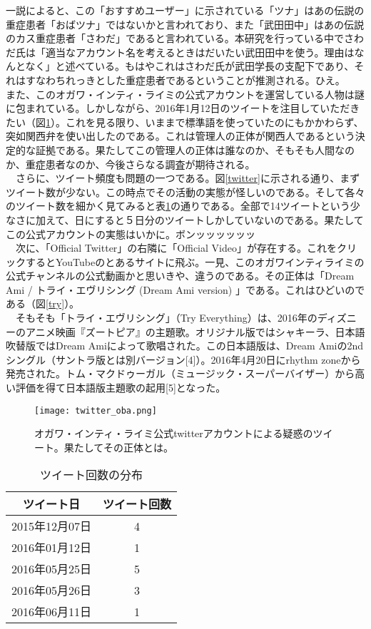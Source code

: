 一説によると、この「おすすめユーザー」に示されている「ツナ」はあの伝説の重症患者「おばツナ」ではないかと言われており、また「武田田中」はあの伝説のカス重症患者「さわだ」であると言われている。本研究を行っている中でさわだ氏は「適当なアカウント名を考えるときはだいたい武田田中を使う。理由はなんとなく」と述べている。もはやこれはさわだ氏が武田学長の支配下であり、それはすなわちれっきとした重症患者であるということが推測される。ひえ。\\
また、このオガワ・インティ・ライミの公式アカウントを運営している人物は謎に包まれている。しかしながら、2016年1月12日のツイートを注目していただきたい（図\ref{twitter_oba}）。これを見る限り、いままで標準語を使っていたのにもかかわらず、突如関西弁を使い出したのである。これは管理人の正体が関西人であるという決定的な証拠である。果たしてこの管理人の正体は誰なのか、そもそも人間なのか、重症患者なのか、今後さらなる調査が期待される。\\
　さらに、ツイート頻度も問題の一つである。図\ref{twitter}に示される通り、まずツイート数が少ない。この時点でその活動の実態が怪しいのである。そして各々のツイート数を細かく見てみると表\ref{twitter_n}の通りである。全部で14ツイートという少なさに加えて、日にすると５日分のツイートしかしていないのである。果たしてこの公式アカウントの実態はいかに。ボンッッッッッッ\\
　次に、「Official Twitter」の右隣に「Official Video」が存在する。これをクリックするとYouTubeのとあるサイトに飛ぶ。一見、このオガワインティライミの公式チャンネルの公式動画かと思いきや、違うのである。その正体は「Dream Ami / トライ・エヴリシング (Dream Ami version) 」である。これはひどいのである（図\ref{try}）。\\
　そもそも「トライ・エヴリシング」（Try Everything）は、2016年のディズニーのアニメ映画『ズートピア』の主題歌。オリジナル版ではシャキーラ、日本語吹替版ではDream Amiによって歌唱された。この日本語版は、Dream Amiの2ndシングル（サントラ版とは別バージョン[4]）。2016年4月20日にrhythm zoneから発売された。トム・マクドゥーガル（ミュージック・スーパーバイザー）から高い評価を得て日本語版主題歌の起用[5]となった。\\


\begin{figure}[H]
  \centering
  \texttt{[image: twitter\_oba.png]}
  \caption{オガワ・インティ・ライミ公式twitterアカウントによる疑惑のツイート。果たしてその正体とは。}
\label{twitter_oba}
\end{figure}

\begin{table}[htb]

	\begin{center}	\begin{tabular}{|c|c|} 
	\hline
ツイート日&ツイート回数 \tabularnewline  \hline
2015年12月07日&4 \tabularnewline  \hline
2016年01月12日&1 \tabularnewline  \hline
2016年05月25日&5 \tabularnewline  \hline
2016年05月26日&3 \tabularnewline  \hline
2016年06月11日&1 \tabularnewline  \hline
	\end{tabular}
	\end{center}
	\caption{ツイート回数の分布}  
	\label{twitter_n}
\end{table}

